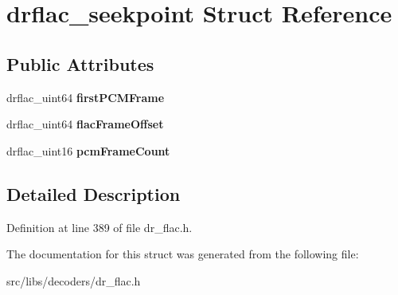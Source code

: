 \hypertarget{structdrflac__seekpoint}{\section{drflac\-\_\-seekpoint Struct Reference}
\label{structdrflac__seekpoint}
}
\subsection*{Public Attributes}
\begin{DoxyCompactItemize}
\item 
\hypertarget{structdrflac__seekpoint_a1b504594b9b7da1617c0bc7908acedb2}{drflac\-\_\-uint64 {\bfseries first\-P\-C\-M\-Frame}}\label{structdrflac__seekpoint_a1b504594b9b7da1617c0bc7908acedb2}

\item 
\hypertarget{structdrflac__seekpoint_a0c9bd08786bcdcc4e5c50e23f7ea9fc9}{drflac\-\_\-uint64 {\bfseries flac\-Frame\-Offset}}\label{structdrflac__seekpoint_a0c9bd08786bcdcc4e5c50e23f7ea9fc9}

\item 
\hypertarget{structdrflac__seekpoint_a19dacb58469b4fff4460496e471421df}{drflac\-\_\-uint16 {\bfseries pcm\-Frame\-Count}}\label{structdrflac__seekpoint_a19dacb58469b4fff4460496e471421df}

\end{DoxyCompactItemize}


\subsection{Detailed Description}


Definition at line 389 of file dr\-\_\-flac.\-h.



The documentation for this struct was generated from the following file\-:\begin{DoxyCompactItemize}
\item 
src/libs/decoders/dr\-\_\-flac.\-h\end{DoxyCompactItemize}

